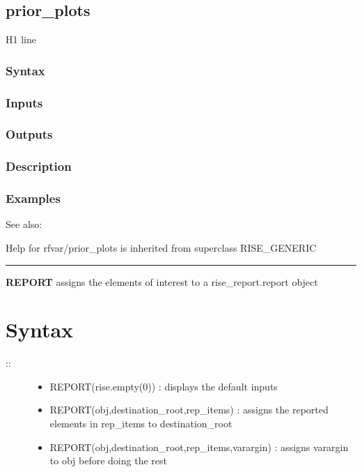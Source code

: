 \documentclass[letterpaper,10pt,english]{sphinxmanual}
\begin{document}
\subsection{prior\_plots}
\label{classes/models/@rfvar/rfvar:id98}\label{classes/models/@rfvar/rfvar:prior-plots}
H1 line


\subsubsection{Syntax}
\label{classes/models/@rfvar/rfvar:id99}

\subsubsection{Inputs}
\label{classes/models/@rfvar/rfvar:id100}

\subsubsection{Outputs}
\label{classes/models/@rfvar/rfvar:id101}

\subsubsection{Description}
\label{classes/models/@rfvar/rfvar:id102}

\subsubsection{Examples}
\label{classes/models/@rfvar/rfvar:id103}
See also:

Help for rfvar/prior\_plots is inherited from superclass RISE\_GENERIC


\bigskip\hrule{}\bigskip

\label{classes/models/@rfvar/rfvar:report}
\textbf{REPORT} assigns the elements of interest to a rise\_report.report object


\section{Syntax}
\label{classes/models/@rfvar/rfvar:id104}\begin{description}
\item[{::}] \leavevmode\begin{itemize}
\item {} 
REPORT(rise.empty(0)) : displays the default inputs

\item {} 
REPORT(obj,destination\_root,rep\_items) : assigns the reported
elements in rep\_items to destination\_root

\item {} 
REPORT(obj,destination\_root,rep\_items,varargin) : assigns varargin to
obj before doing the rest

\end{itemize}

\end{description}
\end{document}
